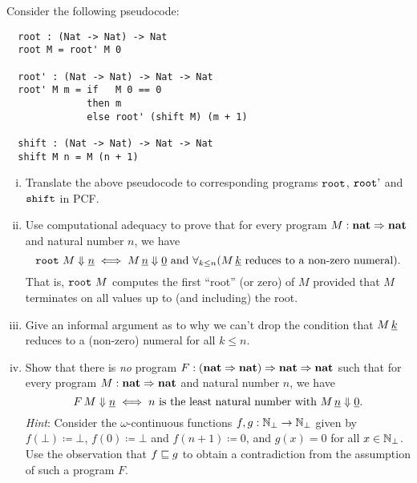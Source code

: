 \begin{exercise}\label{exer:finding-roots}
  Consider the following pseudocode:

\begin{verbatim}
  root : (Nat -> Nat) -> Nat
  root M = root' M 0

  root' : (Nat -> Nat) -> Nat -> Nat
  root' M m = if   M 0 == 0
              then m
              else root' (shift M) (m + 1)

  shift : (Nat -> Nat) -> Nat -> Nat
  shift M n = M (n + 1)
\end{verbatim}
  \begin{enumerate}[(i), itemsep=5pt]
  \item Translate the above pseudocode to corresponding programs \(\operatorname{\mathtt{root}}\),
    \(\operatorname{\mathtt{root'}}\) and \(\operatorname{\mathtt{shift}}\) in PCF.
  \item Use computational adequacy to prove that for every program
    \(M : \mathtt{\mathbf{nat}} \Rightarrow \mathtt{\mathbf{nat}}\) and natural number \(n\), we have
    \[
      \pcfroot\,M \bigstep \numeral{n} \iff %
      M \, \numeral{n} \bigstep \numeral{0} \text{ and } %
      \forall_{k \leq n}\pa*{M \, \numeral{k} \text{ reduces to a non-zero numeral}}.
     \]
     That is, \(\operatorname{\mathtt{root}} \, M\) computes the first ``root'' (or zero) of \(M\)
     provided that \(M\) terminates on all values up to (and including) the
     root.
   \item Give an informal argument as to why we can't drop the condition that
     \(M \, \underline{k}\) reduces to a (non-zero) numeral for all \(k \leq n\).
   \item Show that there is \emph{no} program
     \(F : (\mathtt{\mathbf{nat}} \Rightarrow \mathtt{\mathbf{nat}}) \Rightarrow \mathtt{\mathbf{nat}} \Rightarrow \mathtt{\mathbf{nat}}\) such that
     for every program \(M : \mathtt{\mathbf{nat}} \Rightarrow \mathtt{\mathbf{nat}}\) and natural number \(n\),
     we have
     \[
       F\,M \bigstep \numeral{n} \iff %
       n \text{ is the least natural number with } M \, \numeral{n} \bigstep \numeral{0}.
     \]
     \emph{Hint}: Consider the \(\omega\)-continuous functions
     \(f,g : \mathbb N_\bot \to \mathbb N_\bot \) given by \(f(\bot) \coloneqq \bot\),
     \(f(0) \coloneqq \bot\) and \(f(n+1) \coloneqq 0\), and \(g(x) = 0\) for
     all \(x \in \mathbb N_\bot\).
     Use the observation that \(f \sqsubseteq g\) to obtain a contradiction from the
     assumption of such a program \(F\).
     \qedhere
  \end{enumerate}
\end{exercise}

